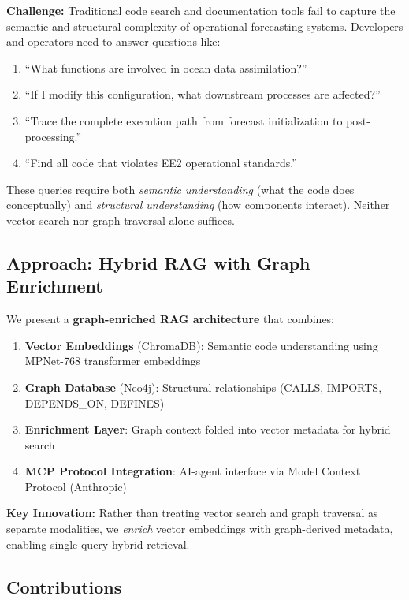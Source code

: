 \documentclass[11pt,letterpaper]{article}
\begin{document}
\textbf{Challenge:} Traditional code search and documentation tools fail to capture the semantic and structural complexity of operational forecasting systems. Developers and operators need to answer questions like:

\begin{enumerate}
    \item ``What functions are involved in ocean data assimilation?''
    \item ``If I modify this configuration, what downstream processes are affected?''
    \item ``Trace the complete execution path from forecast initialization to post-processing.''
    \item ``Find all code that violates EE2 operational standards.''
\end{enumerate}

These queries require both \textit{semantic understanding} (what the code does conceptually) and \textit{structural understanding} (how components interact). Neither vector search nor graph traversal alone suffices.

\subsection{Approach: Hybrid RAG with Graph Enrichment}

We present a \textbf{graph-enriched RAG architecture} that combines:

\begin{enumerate}
    \item \textbf{Vector Embeddings} (ChromaDB): Semantic code understanding using MPNet-768 transformer embeddings
    \item \textbf{Graph Database} (Neo4j): Structural relationships (CALLS, IMPORTS, DEPENDS\_ON, DEFINES)
    \item \textbf{Enrichment Layer}: Graph context folded into vector metadata for hybrid search
    \item \textbf{MCP Protocol Integration}: AI-agent interface via Model Context Protocol (Anthropic)
\end{enumerate}

\textbf{Key Innovation:} Rather than treating vector search and graph traversal as separate modalities, we \textit{enrich} vector embeddings with graph-derived metadata, enabling single-query hybrid retrieval.

\subsection{Contributions}
\end{document}
